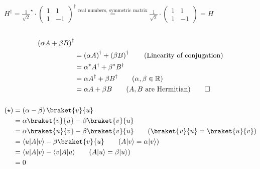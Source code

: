 \documentclass[a4paper,10pt]{hw}
\DeclarePairedDelimiter\bra{\langle}{\rvert}
\DeclarePairedDelimiter\ket{\lvert}{\rangle}
\begin{document}
\subsubsection{}

$H^\dagger = \frac{1}{\sqrt{2}}^\star \cdot \begin{pmatrix} 1 & 1 \\ 1 & -1 \end{pmatrix}^\dagger \stackrel{\text{real numbers, symmetric matrix}}{=} \frac{1}{\sqrt{2}}
\cdot \begin{pmatrix} 1 & 1 \\ 1 & -1 \end{pmatrix} = H$

\subsection{}

\subsubsection{}

\begin{align*}
\left(\alpha A + \beta B\right)^\dagger &
\\ &= \left(\alpha A\right)^\dagger + \left(\beta B\right)^\dagger		\tag{Linearity of conjugation}
\\ &= \alpha^* A^\dagger + \beta^* B^\dagger	
\\ &= \alpha A^\dagger + \beta B^\dagger	\tag{$\alpha, \beta \in \mathbb{R}$}
\\ &= \alpha A + \beta B	\tag{$A, B$ are Hermitian} \qedhere
\end{align*}

\subsubsection{}

\begin{align*}
\left(\star\right) &= \left(\alpha - \beta\right)\braket{v}{u}
\\ &= \alpha\braket{v}{u} - \beta\braket{v}{u}
\\ &= \alpha\braket{u}{v} - \beta\braket{v}{u}		\tag{$\braket{v}{u}=\braket{u}{v}$}
\\ &= \bra{u}A\ket{v} - \beta\braket{v}{u}			\tag{$A\ket{v}=\alpha\ket{v}$}
\\ &= \bra{u}A\ket{v} - \bra{v}A\ket{u}				\tag{$A\ket{u}=\beta\ket{u}$}
\\ &= 0
\end{align*}
\end{document}
